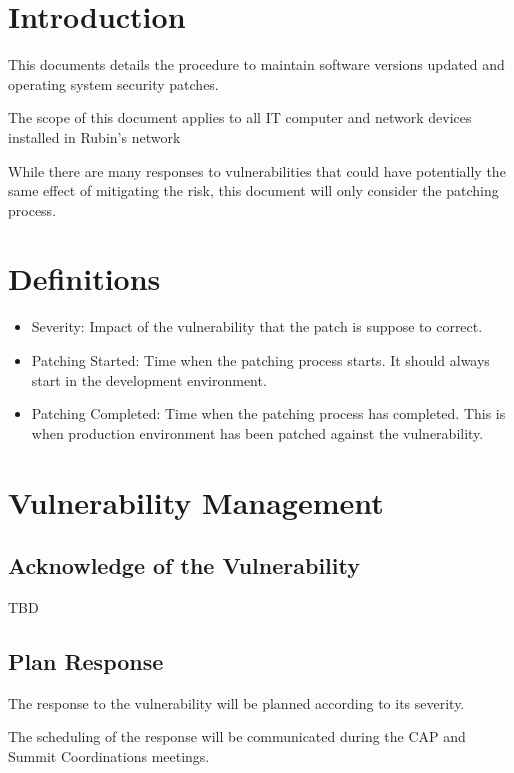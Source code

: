 \section{Introduction}

This documents details the procedure to maintain software versions updated and operating system security patches. 

The scope of this document applies to all IT computer and network devices installed in Rubin's network

While there are many responses to vulnerabilities that could have potentially the same effect of mitigating the risk, this document will only consider the patching process. 


\section{Definitions}

\begin{itemize}
    \item Severity: Impact of the vulnerability that the patch is suppose to correct. 
    \item Patching Started: Time when the patching process starts. It should always start in the development environment.
    \item Patching Completed: Time when the patching process has completed. This is when production environment has been patched against the vulnerability.
\end{itemize}

\section{Vulnerability Management}

\subsection{Acknowledge of the Vulnerability}

TBD

\subsection{Plan Response}

The response to the vulnerability will be planned according to its severity.

The scheduling of the response will be communicated during the CAP and Summit Coordinations meetings. 


